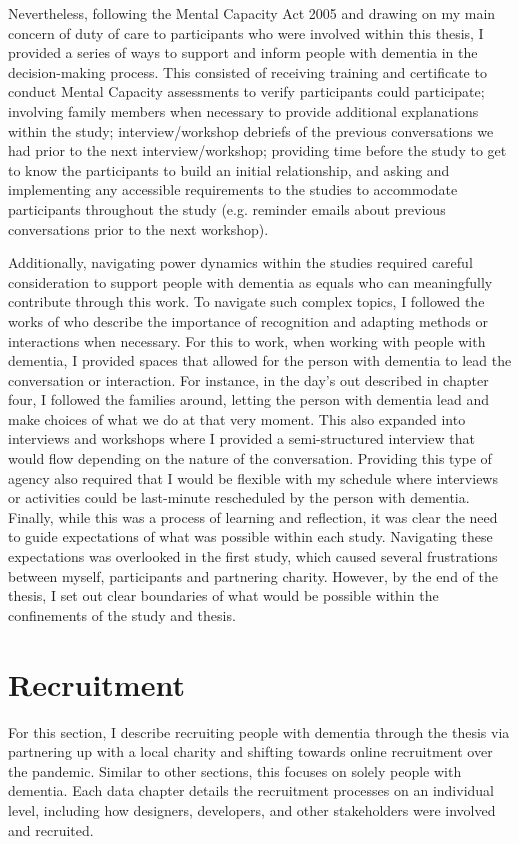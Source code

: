 Nevertheless, following the Mental Capacity Act 2005 \citep{oyebode_mental_2005} and drawing on my main concern of duty of care to participants who were involved within this thesis, I provided a series of ways to support and inform people with dementia in the decision-making process. This consisted of receiving training and certificate to conduct Mental Capacity assessments to verify participants could participate; involving family members when necessary to provide additional explanations within the study; interview/workshop debriefs of the previous conversations we had prior to the next interview/workshop; providing time before the study to get to know the participants to build an initial relationship, and asking and implementing any accessible requirements to the studies to accommodate participants throughout the study (e.g. reminder emails about previous conversations prior to the next workshop). 

Additionally, navigating power dynamics within the studies required careful consideration to support people with dementia as equals who can meaningfully contribute through this work. To navigate such complex topics, I followed the works of \cite{foley_struggle_2019,morrissey_value_2017, lazar_critical_2017} who describe the importance of recognition and adapting methods or interactions when necessary. For this to work, when working with people with dementia, I provided spaces that allowed for the person with dementia to lead the conversation or interaction. For instance, in the day's out described in chapter four, I followed the families around, letting the person with dementia lead and make choices of what we do at that very moment. This also expanded into interviews and workshops where I provided a semi-structured interview that would flow depending on the nature of the conversation. Providing this type of agency also required that I would be flexible with my schedule where interviews or activities could be last-minute rescheduled by the person with dementia. Finally, while this was a process of learning and reflection, it was clear the need to guide expectations of what was possible within each study. Navigating these expectations was overlooked in the first study, which caused several frustrations between myself, participants and partnering charity. However, by the end of the thesis, I set out clear boundaries of what would be possible within the confinements of the study and thesis.

\section{Recruitment}
\label{Method:Recruitment}
For this section, I describe recruiting people with dementia through the thesis via partnering up with a local charity and shifting towards online recruitment over the pandemic. Similar to other sections, this focuses on solely people with dementia. Each data chapter details the recruitment processes on an individual level, including how designers, developers, and other stakeholders were involved and recruited.

